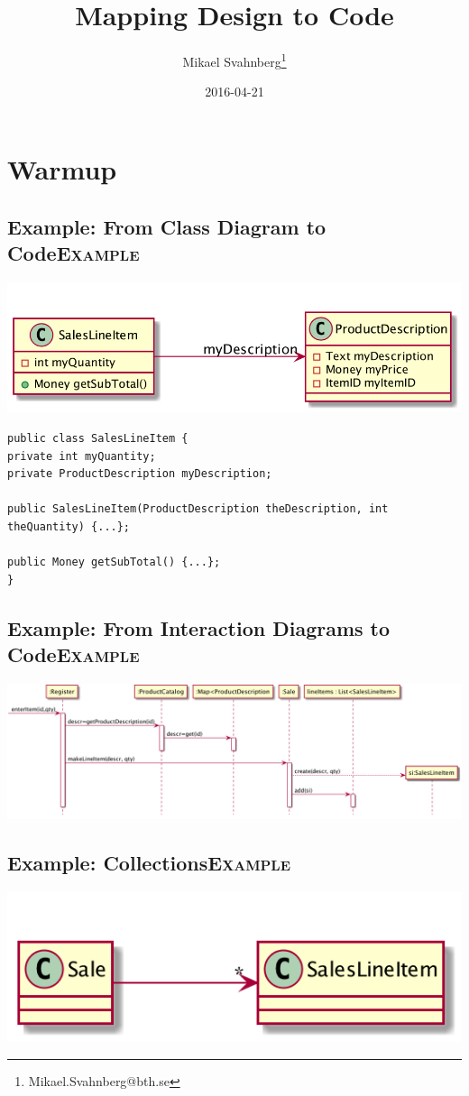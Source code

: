 \documentclass[10pt,t,a4paper]{article}
\author{Mikael Svahnberg\thanks{Mikael.Svahnberg@bth.se}}
\date{2016-04-21}
\title{Mapping Design to Code}
\begin{document}
\maketitle

\section{Warmup}
\label{sec:orgheadline5}
\subsection{Example: From Class Diagram to Code\hfill{}\textsc{Example}}
\label{sec:orgheadline1}
\includegraphics[width=.9\linewidth]{FClassToCode.png}

\begin{verbatim}
public class SalesLineItem {
private int myQuantity;
private ProductDescription myDescription;

public SalesLineItem(ProductDescription theDescription, int theQuantity) {...};

public Money getSubTotal() {...};
}
\end{verbatim}

\subsection{Example: From Interaction Diagrams to Code\hfill{}\textsc{Example}}
\label{sec:orgheadline2}
\includegraphics[width=.9\linewidth]{FInteractionToCode.png}

\subsection{Example: Collections\hfill{}\textsc{Example}}
\label{sec:orgheadline3}
\includegraphics[width=.9\linewidth]{FCollectionsToCode.png}
\end{document}
